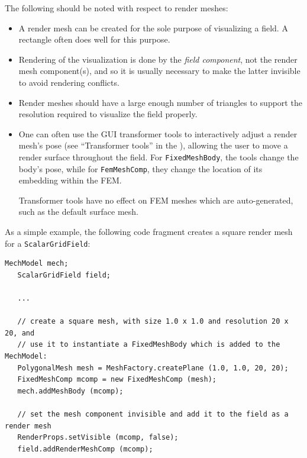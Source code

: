 The following should be noted with respect to render meshes:

\begin{itemize}

\item A render mesh can be created for the sole
purpose of visualizing a field. A rectangle often does well for this
purpose.

\item Rendering of the visualization is done by the {\it field component},
not the render mesh component(s), and so it is usually necessary to
make the latter invisible to avoid rendering conflicts.

\item Render meshes should have a large enough number of triangles to
support the resolution required to visualize the field properly.

\item One can often use the GUI transformer tools
to interactively adjust a render mesh's pose (see ``Transformer
tools'' in the ), allowing the user to move a render surface throughout the
field.  For {\tt FixedMeshBody}, the tools change the body's pose,
while for {\tt FemMeshComp}, they change the location of its embedding
within the FEM.

\begin{sideblock}
Transformer tools have no effect on FEM meshes which are
auto-generated, such as the default surface mesh.
\end{sideblock}

\end{itemize}

As a simple example, the following code fragment creates a square
render mesh for a {\tt ScalarGridField}:
%
\begin{lstlisting}[]
   MechModel mech;
   ScalarGridField field;

   ...

   // create a square mesh, with size 1.0 x 1.0 and resolution 20 x 20, and
   // use it to instantiate a FixedMeshBody which is added to the MechModel:
   PolygonalMesh mesh = MeshFactory.createPlane (1.0, 1.0, 20, 20);
   FixedMeshComp mcomp = new FixedMeshComp (mesh);
   mech.addMeshBody (mcomp);

   // set the mesh component invisible and add it to the field as a render mesh
   RenderProps.setVisible (mcomp, false);
   field.addRenderMeshComp (mcomp);
\end{lstlisting}
%

